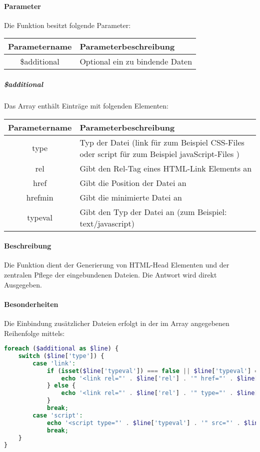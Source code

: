 \paragraph{Parameter} Die Funktion besitzt folgende Parameter:
\begin{table}[H]
	\begin{tabular}{|c|p{11cm}|}
		\hline
		\textbf{Parametername} & \textbf{Parameterbeschreibung} \\ \hline
		\$additional & Optional ein zu bindende Daten \\ \hline
	\end{tabular}
\end{table}
\subparagraph{\$additional}Das Array enthält Einträge mit folgenden Elementen:
\begin{table}[H]
	\begin{tabular}{|c|p{11cm}|}
		\hline
		\textbf{Parametername} & \textbf{Parameterbeschreibung} \\ \hline
		type    & Typ der Datei ({\glqq link\grqq} für zum Beispiel CSS-Files oder {\glqq script\grqq} für zum Beispiel javaScript-Files ) \\ \hline
		rel     & Gibt den Rel-Tag eines HTML-Link Elements an \\ \hline
		href    & Gibt die Position der Datei an \\ \hline
		hrefmin & Gibt die minimierte Datei an \\ \hline
		typeval & Gibt den Typ der Datei an (zum Beispiel: {\glqq text/javascript\grqq}) \\ \hline
	\end{tabular}
\end{table}
\paragraph{Beschreibung} Die Funktion dient der Generierung von HTML-Head Elementen und der zentralen Pflege der eingebundenen Dateien. Die Antwort wird direkt Ausgegeben.
\paragraph{Besonderheiten} Die Einbindung zusätzlicher Dateien erfolgt in der im Array angegebenen Reihenfolge mittels:
\begin{lstlisting}[language=php]
foreach ($additional as $line) {
	switch ($line['type']) {
		case 'link':
			if (isset($line['typeval']) === false || $line['typeval'] === "") {
				echo '<link rel="' . $line['rel'] . '" href="' . $line['href'] . '" >';
			} else {
				echo '<link rel="' . $line['rel'] . '" type="' . $line['typeval'] . '" href="' . $line['href'] . '" >';
			}
			break;
		case 'script':
			echo '<script type="' . $line['typeval'] . '" src="' . $line['href'] . '" ></script>';
			break;
	}
}
\end{lstlisting}
